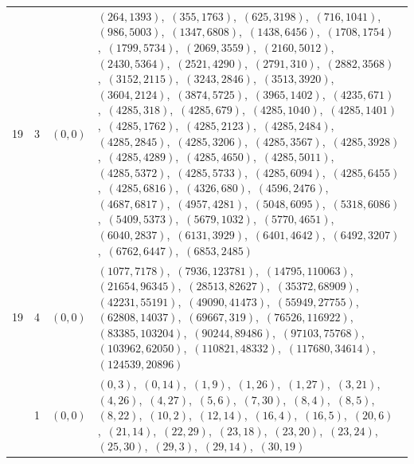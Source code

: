 \documentclass[11pt]{article}
\begin{document}
\begin{longtable}{@{}rrl>{\raggedright\arraybackslash}p{}@{}}
19 & 3 & $(0,0)$ & $(264,1393)$,\allowbreak\ $(355,1763)$,\allowbreak\ $(625,3198)$,\allowbreak\ $(716,1041)$,\allowbreak\ $(986,5003)$,\allowbreak\ $(1347,6808)$,\allowbreak\ $(1438,6456)$,\allowbreak\ $(1708,1754)$,\allowbreak\ $(1799,5734)$,\allowbreak\ $(2069,3559)$,\allowbreak\ $(2160,5012)$,\allowbreak\ $(2430,5364)$,\allowbreak\ $(2521,4290)$,\allowbreak\ $(2791,310)$,\allowbreak\ $(2882,3568)$,\allowbreak\ $(3152,2115)$,\allowbreak\ $(3243,2846)$,\allowbreak\ $(3513,3920)$,\allowbreak\ $(3604,2124)$,\allowbreak\ $(3874,5725)$,\allowbreak\ $(3965,1402)$,\allowbreak\ $(4235,671)$,\allowbreak\ $(4285,318)$,\allowbreak\ $(4285,679)$,\allowbreak\ $(4285,1040)$,\allowbreak\ $(4285,1401)$,\allowbreak\ $(4285,1762)$,\allowbreak\ $(4285,2123)$,\allowbreak\ $(4285,2484)$,\allowbreak\ $(4285,2845)$,\allowbreak\ $(4285,3206)$,\allowbreak\ $(4285,3567)$,\allowbreak\ $(4285,3928)$,\allowbreak\ $(4285,4289)$,\allowbreak\ $(4285,4650)$,\allowbreak\ $(4285,5011)$,\allowbreak\ $(4285,5372)$,\allowbreak\ $(4285,5733)$,\allowbreak\ $(4285,6094)$,\allowbreak\ $(4285,6455)$,\allowbreak\ $(4285,6816)$,\allowbreak\ $(4326,680)$,\allowbreak\ $(4596,2476)$,\allowbreak\ $(4687,6817)$,\allowbreak\ $(4957,4281)$,\allowbreak\ $(5048,6095)$,\allowbreak\ $(5318,6086)$,\allowbreak\ $(5409,5373)$,\allowbreak\ $(5679,1032)$,\allowbreak\ $(5770,4651)$,\allowbreak\ $(6040,2837)$,\allowbreak\ $(6131,3929)$,\allowbreak\ $(6401,4642)$,\allowbreak\ $(6492,3207)$,\allowbreak\ $(6762,6447)$,\allowbreak\ $(6853,2485)$\\
19 & 4 & $(0,0)$ & $(1077,7178)$,\allowbreak\ $(7936,123781)$,\allowbreak\ $(14795,110063)$,\allowbreak\ $(21654,96345)$,\allowbreak\ $(28513,82627)$,\allowbreak\ $(35372,68909)$,\allowbreak\ $(42231,55191)$,\allowbreak\ $(49090,41473)$,\allowbreak\ $(55949,27755)$,\allowbreak\ $(62808,14037)$,\allowbreak\ $(69667,319)$,\allowbreak\ $(76526,116922)$,\allowbreak\ $(83385,103204)$,\allowbreak\ $(90244,89486)$,\allowbreak\ $(97103,75768)$,\allowbreak\ $(103962,62050)$,\allowbreak\ $(110821,48332)$,\allowbreak\ $(117680,34614)$,\allowbreak\ $(124539,20896)$\\
\addlinespace[3pt]
31 & 1 & $(0,0)$ & $(0,3)$,\allowbreak\ $(0,14)$,\allowbreak\ $(1,9)$,\allowbreak\ $(1,26)$,\allowbreak\ $(1,27)$,\allowbreak\ $(3,21)$,\allowbreak\ $(4,26)$,\allowbreak\ $(4,27)$,\allowbreak\ $(5,6)$,\allowbreak\ $(7,30)$,\allowbreak\ $(8,4)$,\allowbreak\ $(8,5)$,\allowbreak\ $(8,22)$,\allowbreak\ $(10,2)$,\allowbreak\ $(12,14)$,\allowbreak\ $(16,4)$,\allowbreak\ $(16,5)$,\allowbreak\ $(20,6)$,\allowbreak\ $(21,14)$,\allowbreak\ $(22,29)$,\allowbreak\ $(23,18)$,\allowbreak\ $(23,20)$,\allowbreak\ $(23,24)$,\allowbreak\ $(25,30)$,\allowbreak\ $(29,3)$,\allowbreak\ $(29,14)$,\allowbreak\ $(30,19)$\\

\end{longtable}
\end{document}
